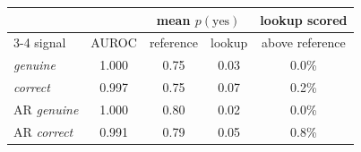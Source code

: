 \begin{tabular}{@{}lcccc@{}}
\toprule
 & & \multicolumn{2}{c}{mean $p(\text{yes})$} & lookup scored \\ \cmidrule(lr){3-4}
signal & AUROC & reference & lookup & above reference \\ \midrule
\kev{} \emph{genuine} & 1.000 & 0.75 & 0.03 & 0.0\% \\
\kev{} \emph{correct} & 0.997 & 0.75 & 0.07 & 0.2\% \\
AR \emph{genuine} & 1.000 & 0.80 & 0.02 & 0.0\% \\
AR \emph{correct} & 0.991 & 0.79 & 0.05 & 0.8\% \\
\bottomrule
\end{tabular}
